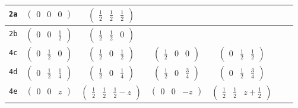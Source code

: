 \documentclass[fleqn,9pt,landscape]{jsarticle}
\begin{document}
\begin{center}
\begin{longtable}{ccccccc}
{\tt 2a} & $ \begin{pmatrix} 0 & 0 & 0 \end{pmatrix} $ & $ \begin{pmatrix} \frac{1}{2} & \frac{1}{2} & \frac{1}{2} \end{pmatrix} $ & $  $ & $  $ & $  $ & $  $ \\ \hline
{\tt 2b} & $ \begin{pmatrix} 0 & 0 & \frac{1}{2} \end{pmatrix} $ & $ \begin{pmatrix} \frac{1}{2} & \frac{1}{2} & 0 \end{pmatrix} $ & $  $ & $  $ & $  $ & $  $ \\ \hline
{\tt 4c} & $ \begin{pmatrix} 0 & \frac{1}{2} & 0 \end{pmatrix} $ & $ \begin{pmatrix} \frac{1}{2} & 0 & \frac{1}{2} \end{pmatrix} $ & $ \begin{pmatrix} \frac{1}{2} & 0 & 0 \end{pmatrix} $ & $ \begin{pmatrix} 0 & \frac{1}{2} & \frac{1}{2} \end{pmatrix} $ & $  $ & $  $ \\ \hline
{\tt 4d} & $ \begin{pmatrix} 0 & \frac{1}{2} & \frac{1}{4} \end{pmatrix} $ & $ \begin{pmatrix} \frac{1}{2} & 0 & \frac{1}{4} \end{pmatrix} $ & $ \begin{pmatrix} \frac{1}{2} & 0 & \frac{3}{4} \end{pmatrix} $ & $ \begin{pmatrix} 0 & \frac{1}{2} & \frac{3}{4} \end{pmatrix} $ & $  $ & $  $ \\ \hline
{\tt 4e} & $ \begin{pmatrix} 0 & 0 & z \end{pmatrix} $ & $ \begin{pmatrix} \frac{1}{2} & \frac{1}{2} & \frac{1}{2} - z \end{pmatrix} $ & $ \begin{pmatrix} 0 & 0 & - z \end{pmatrix} $ & $ \begin{pmatrix} \frac{1}{2} & \frac{1}{2} & z + \frac{1}{2} \end{pmatrix} $ & $  $ & $  $ \\ \hline

\end{longtable}
\end{center}
\end{document}
